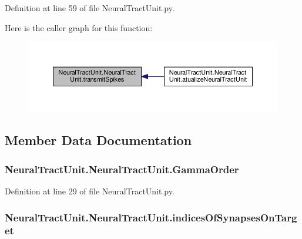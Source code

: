 Definition at line 59 of file Neural\+Tract\+Unit.\+py.



Here is the caller graph for this function\+:\nopagebreak
\begin{figure}[H]
\begin{center}
\leavevmode
\includegraphics[width=350pt]{class_neural_tract_unit_1_1_neural_tract_unit_a6244f11e9aae2d31066e020f9421a9d8_icgraph}
\end{center}
\end{figure}




\subsection{Member Data Documentation}
\subsubsection[{\texorpdfstring{Gamma\+Order}{GammaOrder}}]{\setlength{\rightskip}{0pt plus 5cm}Neural\+Tract\+Unit.\+Neural\+Tract\+Unit.\+Gamma\+Order}\hypertarget{class_neural_tract_unit_1_1_neural_tract_unit_aee01a134ce97127783d75757ec15f352}{}\label{class_neural_tract_unit_1_1_neural_tract_unit_aee01a134ce97127783d75757ec15f352}


Definition at line 29 of file Neural\+Tract\+Unit.\+py.

\subsubsection[{\texorpdfstring{indices\+Of\+Synapses\+On\+Target}{indicesOfSynapsesOnTarget}}]{\setlength{\rightskip}{0pt plus 5cm}Neural\+Tract\+Unit.\+Neural\+Tract\+Unit.\+indices\+Of\+Synapses\+On\+Target}\hypertarget{class_neural_tract_unit_1_1_neural_tract_unit_a4e5fa20e16e924e7f27a087e8f7a19a7}{}\label{class_neural_tract_unit_1_1_neural_tract_unit_a4e5fa20e16e924e7f27a087e8f7a19a7}


